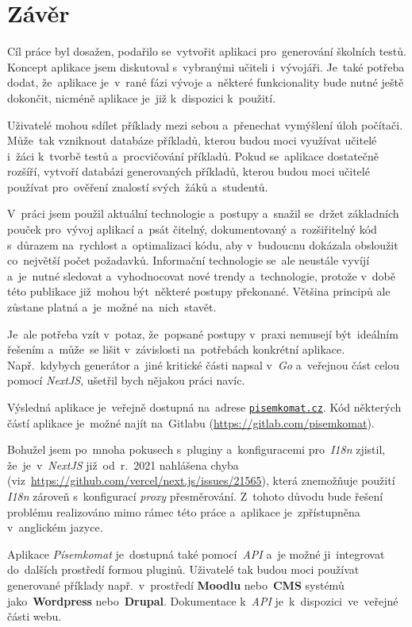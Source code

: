 \documentclass[11pt,a4paper]{report}
\begin{document}
            
    \chapter{Závěr}
        Cíl práce byl dosažen, podařilo se~vytvořit aplikaci pro~generování školních testů. Koncept aplikace jsem diskutoval s~vybranými učiteli i~vývojáři. Je~také potřeba dodat, že~aplikace je~v~rané fázi vývoje a~některé funkcionality bude nutné ještě dokončit, nicméně aplikace je~již k~dispozici k~použití.
        
        Uživatelé mohou sdílet příklady mezi sebou a~přenechat vymýšlení úloh počítači. Může~tak vzniknout databáze příkladů, kterou budou moci využívat učitelé i~žáci k~tvorbě testů a~procvičování příkladů. Pokud se~aplikace dostatečně rozšíří, vytvoří databázi generovaných příkladů, kterou budou moci učitelé používat pro~ověření znalostí svých~žáků a~studentů.
        
        V~práci jsem použil aktuální technologie a~postupy a~snažil se~držet základních pouček pro~vývoj aplikací a~psát čitelný, dokumentovaný a~rozšiřitelný kód s~důrazem na~rychlost a~optimalizaci kódu, aby v~budoucnu dokázala obsloužit co~největší počet požadavků. Informační technologie se~ale neustále vyvíjí a~je~nutné sledovat a~vyhodnocovat nové trendy a~technologie, protože v~době této publikace již~mohou být~některé postupy překonané. Většina principů ale zůstane platná a~je~možné na~nich~stavět.
        
        Je~ale potřeba vzít v~potaz, že~popsané postupy v~praxi nemusejí být~ideálním řešením a~může~se lišit v~závislosti na~potřebách konkrétní aplikace. Např.~kdybych generátor a~jiné kritické části napsal v~\emph{Go} a~veřejnou část celou pomocí \emph{NextJS}, ušetřil bych nějakou práci navíc.
        
        Výsledná aplikace je~veřejně dostupná na~adrese \href{https://pisemkomat.cz}{\texttt{pisemkomat.cz}}. Kód některých částí aplikace je~možné najít na~Gitlabu (\url{https://gitlab.com/pisemkomat}).

        Bohužel jsem po~mnoha pokusech s~pluginy a~konfiguracemi pro~\emph{I18n} zjistil, že~je~v~\emph{NextJS} již~od~r.~2021 nahlášena chyba (viz~\url{https://github.com/vercel/next.js/issues/21565}), která znemožňuje použití \emph{I18n} zároveň s~konfigurací \emph{proxy} přesměrování. Z~tohoto důvodu bude řešení problému realizováno mimo rámec této práce a~aplikace je~zpřístupněna v~anglickém jazyce.

        Aplikace \emph{Písemkomat} je~dostupná také pomocí~\emph{API} a~je možné ji~integrovat do~dalších prostředí formou pluginů. Uživatelé tak budou moci používat generované příklady např.~v~prostředí \textbf{Moodlu} nebo~\textbf{CMS} systémů jako~\textbf{Wordpress} nebo~\textbf{Drupal}. Dokumentace k~\emph{API} je~k~dispozici~ve~veřejné části webu.
        
\end{document}

